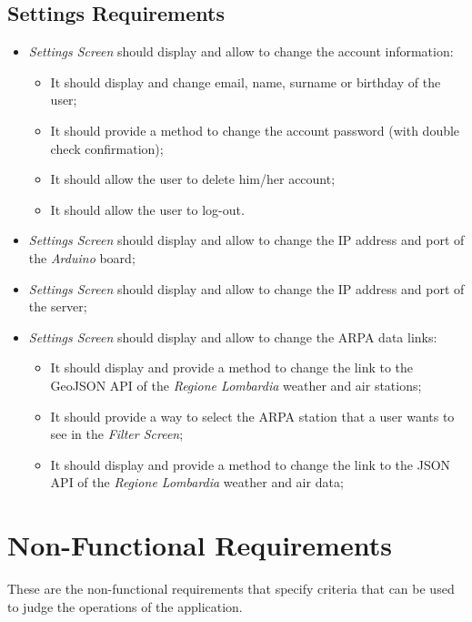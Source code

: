 \subsection{Settings Requirements}
\begin{itemize}
    \item \textit{Settings Screen} should display and allow to change the account information:
        \begin{itemize}
            \item It should display and change email, name, surname or birthday of the user;
            \item It should provide a method to change the account password (with double check confirmation);
            \item It should allow the user to delete him/her account;
            \item It should allow the user to log-out.
        \end{itemize}
    \item \textit{Settings Screen} should display and allow to change the IP address and port of the \textit{Arduino} board;
    \item \textit{Settings Screen} should display and allow to change the IP address and port of the server;
    \item \textit{Settings Screen} should display and allow to change the ARPA data links:
        \begin{itemize}
            \item It should display and provide a method to change the link to the GeoJSON API of the \textit{Regione Lombardia} weather and air stations;
            \item It should provide a way to select the ARPA station that a user wants to see in the \textit{Filter Screen};
            \item It should display and provide a method to change the link to the JSON API of the \textit{Regione Lombardia} weather and air data;
        \end{itemize}
\end{itemize}

\section{Non-Functional Requirements}
These are the non-functional requirements that specify criteria that can be used to judge the operations of the application.

